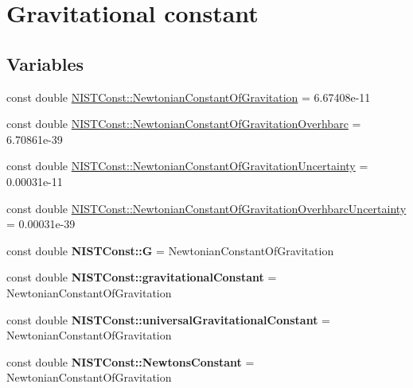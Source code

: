 \hypertarget{group___gravitational_constant}{}\section{Gravitational constant}
\label{group___gravitational_constant}
\subsection*{Variables}
\begin{DoxyCompactItemize}
\item 
const double \hyperlink{group___gravitational_constant_gaba6371307f4cebde50b3c61a07c724c5}{N\+I\+S\+T\+Const\+::\+Newtonian\+Constant\+Of\+Gravitation} = 6.\+67408e-\/11
\item 
const double \hyperlink{group___gravitational_constant_gad7c8d8ef09f60e8f3f36f86f98df0472}{N\+I\+S\+T\+Const\+::\+Newtonian\+Constant\+Of\+Gravitation\+Overhbarc} = 6.\+70861e-\/39
\item 
const double \hyperlink{group___gravitational_constant_ga8fc40fce6dc42f5e84a3c908553e6586}{N\+I\+S\+T\+Const\+::\+Newtonian\+Constant\+Of\+Gravitation\+Uncertainty} = 0.\+00031e-\/11
\item 
const double \hyperlink{group___gravitational_constant_gaf10cbbd8ad1ece4ec01e35fe3d86854f}{N\+I\+S\+T\+Const\+::\+Newtonian\+Constant\+Of\+Gravitation\+Overhbarc\+Uncertainty} = 0.\+00031e-\/39
\item 
\mbox{\label{group___gravitational_constant_gad3f54a7cdc3ea6fd2fbc4a30ce7df201}} 
const double {\bfseries N\+I\+S\+T\+Const\+::G} = Newtonian\+Constant\+Of\+Gravitation
\item 
\mbox{\label{group___gravitational_constant_ga5a77947aedbfa6b29249f5b25f22137b}} 
const double {\bfseries N\+I\+S\+T\+Const\+::gravitational\+Constant} = Newtonian\+Constant\+Of\+Gravitation
\item 
\mbox{\label{group___gravitational_constant_ga8d7552c043dbeda8e536ba6a01af9829}} 
const double {\bfseries N\+I\+S\+T\+Const\+::universal\+Gravitational\+Constant} = Newtonian\+Constant\+Of\+Gravitation
\item 
\mbox{\label{group___gravitational_constant_ga3d83beb8e9a1e0970e5520fe8ca1ace5}} 
const double {\bfseries N\+I\+S\+T\+Const\+::\+Newtons\+Constant} = Newtonian\+Constant\+Of\+Gravitation
\end{DoxyCompactItemize}


